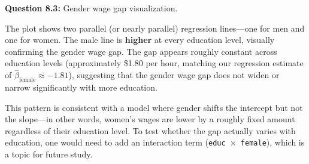 \documentclass[11pt,letterpaper]{article}
\begin{document}
\textbf{Question 8.3:} Gender wage gap visualization.

\begin{answer}
The plot shows two parallel (or nearly parallel) regression lines---one for men and one for women. The male line is \textbf{higher} at every education level, visually confirming the gender wage gap. The gap appears roughly constant across education levels (approximately \$1.80 per hour, matching our regression estimate of $\hat{\beta}_{\text{female}} \approx -1.81$), suggesting that the gender wage gap does not widen or narrow significantly with more education.

This pattern is consistent with a model where gender shifts the intercept but not the slope---in other words, women's wages are lower by a roughly fixed amount regardless of their education level. To test whether the gap actually varies with education, one would need to add an interaction term (\texttt{educ $\times$ female}), which is a topic for future study.
\end{answer}
\end{document}
